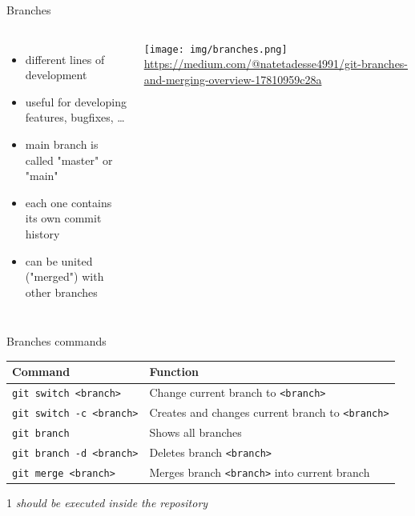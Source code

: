 \documentclass[10pt, graphics, aspectratio=169, table]{beamer}
\begin{document}
    \begin{frame}{Branches}
        \begin{columns}
                \begin{itemize}
                    \item different lines of development
                    \item useful for developing features, bugfixes, \ldots
                    \item main branch is called "master" or "main"
                    \item each one contains its own commit history
                    \item can be united ("merged") with other branches
                \end{itemize}
                \center\texttt{[image: img/branches.png]}
                \center\tiny\url{https://medium.com/@natetadesse4991/git-branches-and-merging-overview-17810959c28a}
        \end{columns}
    \end{frame}

    \begin{frame}{Branches commands}
        \begin{table}
            \centering
            \begin{threeparttable}
                \begin{tabular}{ll}
                    \toprule
                    Command & Function \\
                    \midrule
                    \texttt{git switch <branch>} & Change current branch to \texttt{<branch>}\tnote{1} \\
                    \texttt{git switch -c <branch>} & Creates and changes current branch to \texttt{<branch>}\tnote{1} \\
                    \texttt{git branch} & Shows all branches\tnote{1} \\
                    \texttt{git branch -d <branch>} & Deletes branch \texttt{<branch>}\tnote{1} \\
                    \texttt{git merge <branch>} & Merges branch \texttt{<branch>} into current branch\tnote{1} \\
                    \bottomrule
                \end{tabular}
                \begin{tablenotes}
                    \item [1]\emph{should be executed inside the repository}
                \end{tablenotes}
            \end{threeparttable}
        \end{table}
    \end{frame}
\end{document}
